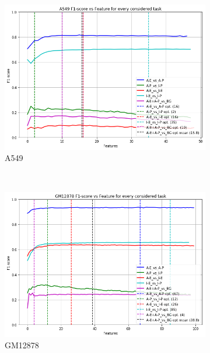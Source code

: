 \begin{figure}[!htb]
    \centering
    \begin{subfigure}[b]{0.48\textwidth}
        \includegraphics[width=\textwidth]{images/features_plots/A549_feature_plot.png}
        \caption{A549}
        \label{fig:A549_n_feat}
    \end{subfigure}
    ~ 
    \begin{subfigure}[b]{0.48\textwidth}
        \includegraphics[width=\textwidth]{images/features_plots/GM12878_feature_plot.png}
        \caption{GM12878}
        \label{fig:GM12878_n_feat}
    \end{subfigure}
    ~ 
    \begin{subfigure}[b]{0.48\textwidth}

\end{subfigure}
\end{figure}

